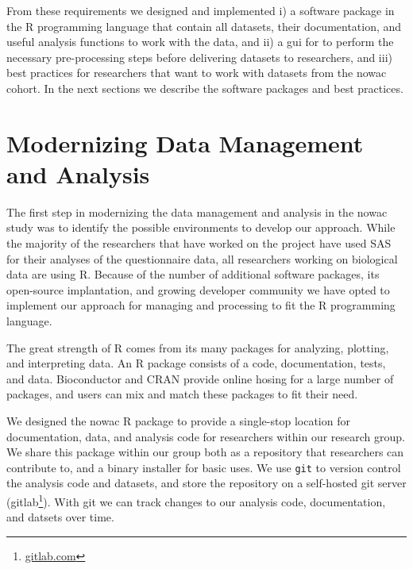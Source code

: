 From these requirements we designed and implemented i) a software package in the
R programming language that contain all datasets, their documentation, and
useful analysis functions to work with the data, and ii) a \gls{gui} for
to perform the necessary pre-processing steps before delivering
datasets to researchers, and iii) 
best practices for researchers that want to work with datasets from the
\gls{nowac} cohort. 
In the next sections we describe the software packages and best practices. 


\section{Modernizing Data Management and Analysis} 
The first step in modernizing the data management and analysis in the
\gls{nowac} study was to identify the possible environments to develop our
approach. While the majority of the researchers that have worked on the project
have used SAS for their analyses of the questionnaire data, all researchers
working on biological data are using R. Because of the number of additional
software  packages, its open-source implantation, and growing developer
community we have opted to implement our approach for managing and processing to
fit the R programming language. 

The great strength of R comes from its many packages for analyzing, plotting,
and interpreting data. An R package consists of a code, documentation, tests,
and data. Bioconductor and CRAN provide online hosing for a large number of
packages, and users can mix and match these packages to fit their need. 

We designed the \gls{nowac} R package to provide a single-stop location for
documentation, data, and analysis code for researchers within our research
group. We share this package within our group both as a repository that
researchers can contribute to, and a binary installer for basic uses. 
We use \texttt{git} to version control the analysis code and datasets, and store
the repository on a self-hosted git server (gitlab\footnote{\url{gitlab.com}}).
With git we can track changes to our analysis code, documentation, and datsets
over time. 

